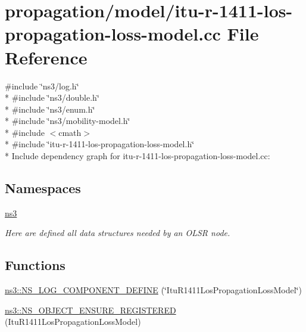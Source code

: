 \hypertarget{itu-r-1411-los-propagation-loss-model_8cc}{}\section{propagation/model/itu-\/r-\/1411-\/los-\/propagation-\/loss-\/model.cc File Reference}
\label{itu-r-1411-los-propagation-loss-model_8cc}
{\ttfamily \#include \char`\"{}ns3/log.\+h\char`\"{}}\\*
{\ttfamily \#include \char`\"{}ns3/double.\+h\char`\"{}}\\*
{\ttfamily \#include \char`\"{}ns3/enum.\+h\char`\"{}}\\*
{\ttfamily \#include \char`\"{}ns3/mobility-\/model.\+h\char`\"{}}\\*
{\ttfamily \#include $<$cmath$>$}\\*
{\ttfamily \#include \char`\"{}itu-\/r-\/1411-\/los-\/propagation-\/loss-\/model.\+h\char`\"{}}\\*
Include dependency graph for itu-\/r-\/1411-\/los-\/propagation-\/loss-\/model.cc\+:
\subsection*{Namespaces}
\begin{DoxyCompactItemize}
\item 
 \hyperlink{namespacens3}{ns3}
\begin{DoxyCompactList}\small\item\em Here are defined all data structures needed by an O\+L\+SR node. \end{DoxyCompactList}\end{DoxyCompactItemize}
\subsection*{Functions}
\begin{DoxyCompactItemize}
\item 
\hyperlink{namespacens3_a0c4e4ddc584ceab46e792673de715df8}{ns3\+::\+N\+S\+\_\+\+L\+O\+G\+\_\+\+C\+O\+M\+P\+O\+N\+E\+N\+T\+\_\+\+D\+E\+F\+I\+NE} (\char`\"{}Itu\+R1411\+Los\+Propagation\+Loss\+Model\char`\"{})
\item 
\hyperlink{namespacens3_a274fc0a5e2e590a5cc3c3d5c323d6470}{ns3\+::\+N\+S\+\_\+\+O\+B\+J\+E\+C\+T\+\_\+\+E\+N\+S\+U\+R\+E\+\_\+\+R\+E\+G\+I\+S\+T\+E\+R\+ED} (Itu\+R1411\+Los\+Propagation\+Loss\+Model)
\end{DoxyCompactItemize}
